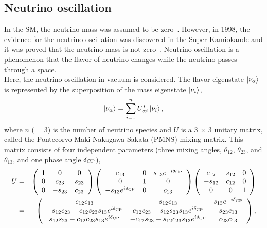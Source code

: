 \subsection{Neutrino oscillation}
\vs\hs
In the SM, the neutrino mass was assumed to be zero~\cite{2022Workman}.
However, in 1998, the evidence for the neutrino oscillation was discovered in the Super-Kamiokande and it was proved that the neutrino mass is not zero~\cite{1998Fukuda}.
Neutrino oscillation is a phenomenon that the flavor of neutrino changes while the neutrino passes through a space.\\
\hs
Here, the neutrino oscillation in vacuum is considered.
The flavor eigenstate $\ket{\nu_{\alpha}}$ is represented by the superposition of the mass eigenstate $\ket{\nu_{i}}$,
\begin{eqnarray}
	\ket{\nu_{\alpha}} = \sum_{i=1}^{n} U_{\alpha i}^{*}\ket{\nu_{i}},
\end{eqnarray}
where $n$ ($= 3$) is the number of neutrino species and $U$ is a 3$\,\times\,$3 unitary matrix, called the Pontecorvo-Maki-Nakagawa-Sakata (PMNS) mixing matrix.
This matrix consists of four independent parameters (three mixing angles, $\theta_{12}$, $\theta_{23}$, and $\theta_{13}$, and one phase angle $\delta_{{\rm CP}}$),
\begin{eqnarray}
	U &=& \left(
	\begin{array}{ccc}
		1 & 0       & 0      \\
		0 & c_{23}  & s_{23} \\
		0 & -s_{23} & c_{23}
	\end{array}
	\right)
	\left(
	\begin{array}{ccc}
		c_{13}                        & 0 & s_{13}e^{-i\delta_{{\rm CP}}} \\
		0                             & 1 & 0                             \\
		-s_{13}e^{i\delta_{{\rm CP}}} & 0 & c_{13}
	\end{array}
	\right)
	\left(
	\begin{array}{ccc}
		c_{12}  & s_{12} & 0 \\
		-s_{12} & c_{12} & 0 \\
		0       & 0      & 1
	\end{array}
	\right) \nonumber \\
	&=&\left(
	\begin{array}{ccc}
		c_{12}c_{13}                                           & s_{12}c_{13}                                           & s_{13}e^{-i\delta_{{\rm CP}}} \\
		-s_{12}c_{23}-c_{12}s_{23}s_{13}e^{i\delta_{{\rm CP}}} & c_{12}c_{23}-s_{12}s_{23}s_{13}e^{i\delta_{{\rm CP}}}  & s_{23}c_{13}                  \\
		s_{12}s_{23}-c_{12}c_{23}s_{13}e^{i\delta_{{\rm CP}}}  & -c_{12}s_{23}-s_{12}c_{23}s_{13}e^{i\delta_{{\rm CP}}} & c_{23}c_{13}
	\end{array}
	\right),
\end{eqnarray}
